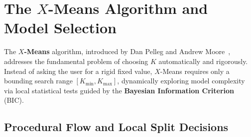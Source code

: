 \section{The \texorpdfstring{$X$}{X}-Means Algorithm and Model Selection}
\label{sec:dm-xmeans-algorithm}

The \textbf{$X$-Means} algorithm, introduced by Dan Pelleg and Andrew Moore~\cite{pelleg2000}, addresses the fundamental problem of choosing $K$ automatically and rigorously. Instead of asking the user for a rigid fixed value, $X$-Means requires only a bounding search range $[K_{\min}, K_{\max}]$, dynamically exploring model complexity via local statistical tests guided by the \textbf{Bayesian Information Criterion} (BIC).

\subsection{Procedural Flow and Local Split Decisions}

